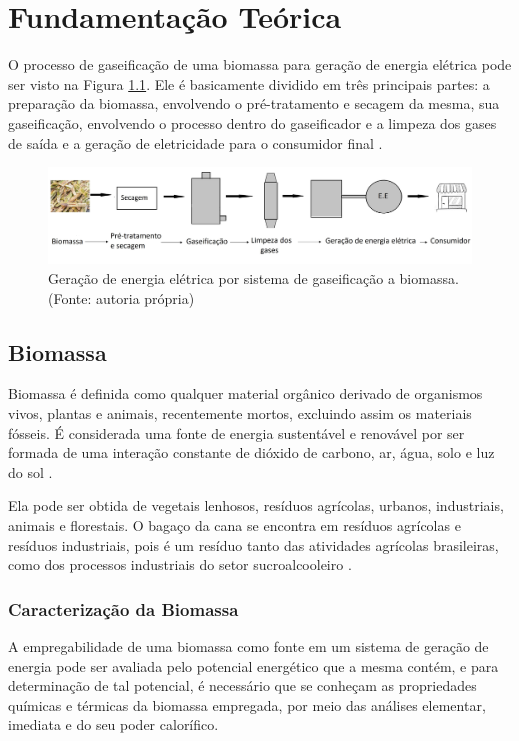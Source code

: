 \chapter[Fundamentação Teórica]{Fundamentação Teórica}

O processo de gaseificação de uma biomassa para geração de energia elétrica pode ser visto na Figura \ref{fluxograma}. Ele é basicamente dividido em três principais partes: a preparação da biomassa, envolvendo o pré-tratamento e secagem da mesma, sua gaseificação, envolvendo o processo dentro do gaseificador e a limpeza dos gases de saída e a geração de eletricidade para o consumidor final \cite{chaves2016}.

\begin{figure}[!htb]
	\centering
	\includegraphics[width = 16cm]{fluxograma_2}
	\caption{Geração de energia elétrica por sistema de gaseificação a biomassa. (Fonte: autoria própria)}
	\label{fluxograma}
\end{figure}


\section{Biomassa}

Biomassa é definida como qualquer material orgânico derivado de organismos vivos, plantas e animais, recentemente mortos, excluindo assim os materiais fósseis. É considerada uma fonte de energia sustentável e renovável por ser formada de uma interação constante de dióxido de carbono, ar, água, solo e luz do sol \cite{basu2010}.

Ela pode ser obtida de vegetais lenhosos, resíduos agrícolas, urbanos, industriais, animais e florestais. O bagaço da cana se encontra em resíduos agrícolas e resíduos industriais, pois é um resíduo tanto das atividades agrícolas brasileiras, como dos processos industriais do setor sucroalcooleiro \cite{biomassacortez}.
	
\subsection{Caracterização da Biomassa}

A empregabilidade de uma biomassa como fonte em um sistema de geração de energia pode ser avaliada pelo potencial energético que a mesma contém, e para determinação de tal potencial, é necessário que se conheçam as propriedades químicas e térmicas da biomassa empregada, por meio das análises elementar, imediata e do seu poder calorífico.

